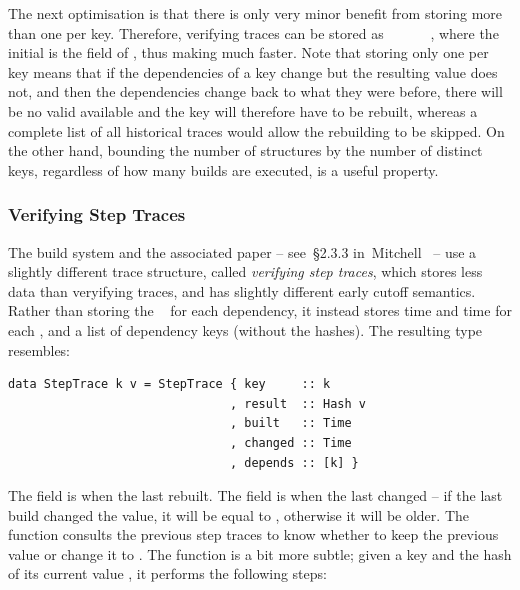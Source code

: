 The next optimisation is that there is only very minor benefit from storing more
than one  per key. Therefore, verifying traces can be stored as
~~~~~~, where the
initial  is the  field of , thus making 
much faster. Note that storing only one  per key means that if the
dependencies of a key change but the resulting value does not, and then the
dependencies change back to what they were before, there will be no valid
 available and the key will therefore have to be rebuilt, whereas a
complete list of all historical traces would allow the rebuilding to be skipped.
On the other hand, bounding the number of  structures by the number of
distinct keys, regardless of how many builds are executed, is a useful property.

\subsubsection{Verifying Step Traces}\label{sec-step-traces}

The \Shake build system and the associated paper -- see~\S2.3.3
in~Mitchell~ -- use a slightly different trace
structure, called \emph{verifying step traces},
which stores less data than veryifying traces, and has slightly different early cutoff semantics. Rather than
storing the ~ for each dependency, it instead stores 
time and  time for each , and a list of dependency keys
(without the hashes). The resulting  type resembles:

\vspace{1mm}
\begin{verbatim}
data StepTrace k v = StepTrace { key     :: k
                               , result  :: Hash v
                               , built   :: Time
                               , changed :: Time
                               , depends :: [k] }
\end{verbatim}
\vspace{1mm}

\noindent
The  field is when the  last rebuilt. The  field
is when the  last changed -- if the last build changed the value, it
will be equal to , otherwise it will be older. The function
 consults the previous step traces to know whether to keep the
previous  value or change it to . The function
 is a bit more subtle; given a key  and the hash of its
current value , it performs the following steps:

